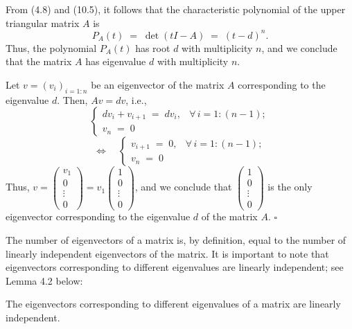 \begin{answerx}
From (4.8) and (10.5), it follows that the characteristic polynomial of the upper
triangular matrix $A$ is
\[
P_A(t) \;=\; \det(tI-A) \;=\; (t-d)^n.
\]
Thus, the polynomial $P_A(t)$ has root $d$ with multiplicity $n$, and we conclude that
the matrix $A$ has eigenvalue $d$ with multiplicity $n$.

Let $v = (v_i)_{i=1:n}$ be an eigenvector of the matrix $A$ corresponding to the
eigenvalue $d$. Then, $Av = dv$, i.e.,
\[
\begin{cases}
dv_i + v_{i+1} \;=\; dv_i, & \forall\, i = 1:(n-1);\\
v_n \;=\; 0
\end{cases}
\]
\[
\Longleftrightarrow\quad
\begin{cases}
v_{i+1} \;=\; 0, & \forall\, i = 1:(n-1);\\
v_n \;=\; 0
\end{cases}
\]
Thus, $v = \begin{pmatrix}v_1\\0\\\vdots\\0\end{pmatrix} =
v_1\begin{pmatrix}1\\0\\\vdots\\0\end{pmatrix}$, and we conclude that
$\begin{pmatrix}1\\0\\\vdots\\0\end{pmatrix}$ is the only eigenvector corresponding to
the eigenvalue $d$ of the matrix $A$. \hfill$\square$
\end{answerx}

The number of eigenvectors of a matrix is, by definition, equal to the number of
linearly independent eigenvectors of the matrix. It is important to note that
eigenvectors corresponding to different eigenvalues are linearly independent; see
Lemma 4.2 below:

\begin{lemma}
The eigenvectors corresponding to different eigenvalues of a matrix are linearly
independent.
\end{lemma}

